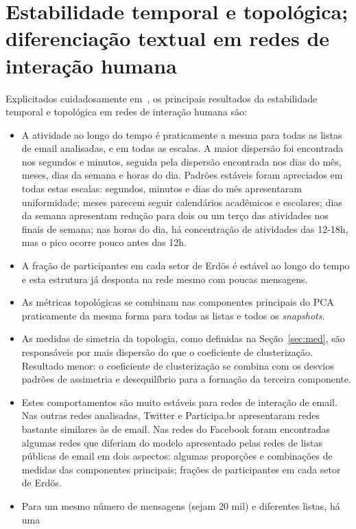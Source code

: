 \documentclass[a4paper,openright,12pt]{report} %
\begin{document}
\section{Estabilidade temporal e topológica; diferenciação textual em redes de interação humana}\label{sec:timeS}
Explicitados cuidadosamente em~\cite{timeS}, os principais resultados da estabilidade temporal e topológica em redes de interação humana são:
\begin{itemize}
    \item A atividade ao longo do tempo é praticamente a mesma para todas as listas de email analisadas, e em todas as escalas. A maior dispersão foi encontrada nos segundos e minutos, seguida pela dispersão encontrada nos dias do mês, meses, dias da semana e horas do dia. Padrões estáveis foram apreciados em todas estas escalas: segundos, minutos e dias do mês apresentaram uniformidade; meses parecem seguir calendários acadêmicos e escolares; dias da semana apresentam redução para dois ou um terço das atividades nos finais
        de semana;
        nas horas do dia, há concentração de atividades das 12-18h, mas o pico ocorre pouco antes das 12h.
    \item A fração de participantes em cada setor de Erdös é estável ao longo do tempo e
        esta estrutura já desponta na rede mesmo com poucas mensagens.
    \item As métricas topológicas se combinam nas componentes principais do PCA praticamente 
        da mesma forma para todas as listas e todos os \emph{snapshots}.
    \item As medidas de simetria da topologia, como definidas na Seção~\ref{sec:med},
        são responsáveis por mais dispersão do que o coeficiente de clusterização.
        Resultado menor: 
        o coeficiente de clusterização se combina com os desvios padrões de assimetria e desequilíbrio para a formação da terceira componente.
    \item Estes comportamentos são muito estáveis para redes de interação de email.
        Nas outras redes analisadas, Twitter e Participa.br
        apresentaram redes bastante similares às de email. Nas
        redes do Facebook foram encontradas algumas redes que diferiam
    do modelo apresentado pelas redes de listas públicas de email em dois aspectos:
    algumas proporções e combinações de medidas das componentes principais;
    frações de participantes em cada setor de Erdös.
\item Para um mesmo número de mensagens (sejam 20 mil)  e diferentes listas, há uma

\end{itemize}
\end{document}

